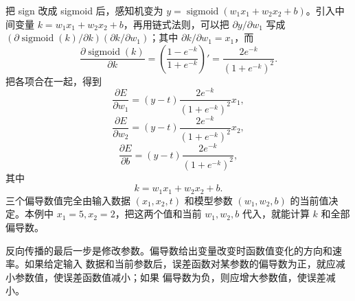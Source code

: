 把 sign 改成 sigmoid 后，感知机变为
$y=\operatorname{sigmoid}(w_1x_1+w_2x_2+b)$。引入中间变量
$k=w_1x_1+w_2x_2+b$，再用链式法则，可以把 $\partial y/\partial w_1$ 写成
$(\partial\operatorname{sigmoid}(k)/\partial k)(\partial k/\partial w_1)$；其中
$\partial k/\partial w_1=x_1$，而
\begin{equation}
  \frac{\partial\operatorname{sigmoid}(k)}{\partial k}
  =\left(\frac{1-e^{-k}}{1+e^{-k}}\right)'=
  \frac{2e^{-k}}{(1+e^{-k})^2}.
  \label{eq:appb-9}
\end{equation}
把各项合在一起，得到
\begin{equation}
  \frac{\partial E}{\partial w_1}=(y-t)\frac{2e^{-k}}{(1+e^{-k})^2}x_1,
  \label{eq:appb-10}
\end{equation}
\begin{equation}
  \frac{\partial E}{\partial w_2}=(y-t)\frac{2e^{-k}}{(1+e^{-k})^2}x_2,
  \label{eq:appb-11}
\end{equation}
\begin{equation}
  \frac{\partial E}{\partial b}=(y-t)\frac{2e^{-k}}{(1+e^{-k})^2},
  \label{eq:appb-12}
\end{equation}
其中
\begin{equation}
  k=w_1x_1+w_2x_2+b.
  \label{eq:appb-13}
\end{equation}
三个偏导数值完全由输入数据 $(x_1,x_2,t)$ 和模型参数 $(w_1,w_2,b)$ 的当前值决定。本例中
$x_1=5,x_2=2$，把这两个值和当前 $w_1,w_2,b$ 代入，就能计算 $k$ 和全部偏导数。

反向传播的最后一步是修改参数。偏导数给出变量改变时函数值变化的方向和速率。如果给定输入
数据和当前参数后，误差函数对某参数的偏导数为正，就应减小参数值，使误差函数值减小；如果
偏导数为负，则应增大参数值，使误差减小。

